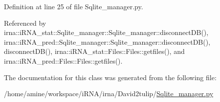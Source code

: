\-Definition at line 25 of file \-Sqlite\-\_\-manager.\-py.



\-Referenced by irna\-::i\-R\-N\-A\-\_\-stat\-::\-Sqlite\-\_\-manager\-::\-Sqlite\-\_\-manager\-::disconnect\-D\-B(), irna\-::i\-R\-N\-A\-\_\-pred\-::\-Sqlite\-\_\-manager\-::\-Sqlite\-\_\-manager\-::disconnect\-D\-B(), disconnect\-D\-B(), irna\-::i\-R\-N\-A\-\_\-stat\-::\-Files\-::\-Files\-::getfiles(), and irna\-::i\-R\-N\-A\-\_\-pred\-::\-Files\-::\-Files\-::getfiles().



\-The documentation for this class was generated from the following file\-:\begin{DoxyCompactItemize}
\item 
/home/amine/workspace/i\-R\-N\-A/irna/\-David2tulip/\hyperlink{David2tulip_2Sqlite__manager_8py}{\-Sqlite\-\_\-manager.\-py}\end{DoxyCompactItemize}
